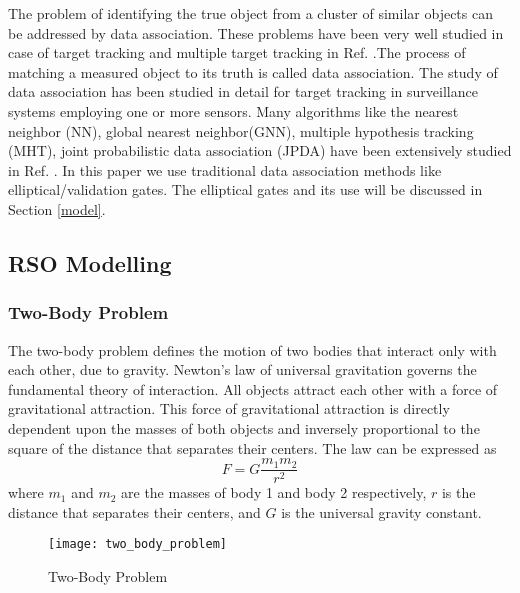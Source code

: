 \documentclass[]{aiaa-tc}%
\begin{document}
The problem of identifying the true object from a cluster of similar objects can be addressed by data association. These problems have been very well studied in case of target tracking and multiple target tracking in  Ref. .The process of matching a measured object to its truth is called data association. The study of data association has been studied in detail for target tracking in surveillance systems employing one or more sensors. Many algorithms like the nearest neighbor (NN), global nearest neighbor(GNN), multiple hypothesis tracking (MHT), joint probabilistic data association (JPDA) have been extensively studied in Ref. . In this paper we use traditional data association methods like elliptical/validation gates. The elliptical gates and its use will be discussed in Section \ref{model}.

\subsection{RSO Modelling}

\subsubsection{Two-Body Problem}

The two-body problem defines the motion of two bodies that interact only with each other, due to gravity. Newton's law of universal gravitation governs the fundamental theory of interaction. All objects attract each other with a force of gravitational attraction. This force of gravitational attraction is directly dependent upon the masses of both objects and inversely proportional to the square of the distance that separates their centers. The law can be expressed as
\begin{equation}
F=G\frac{m_1m_2}{r^2}
\end{equation}
where $m_1$ and $m_2$ are the masses of body 1 and body 2 respectively, $r$ is the distance that separates their centers, and $G$ is the universal gravity constant.

\begin{figure}[h]
  \centering
    \texttt{[image: two\_body\_problem]}
  \caption{Two-Body Problem}
  \label{fig:two_body_problem}
\end{figure}
\end{document}
